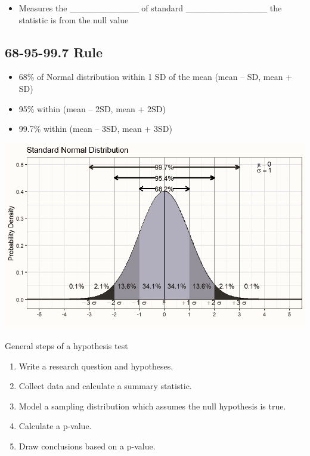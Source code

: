 \documentclass[
]{report}
\providecommand{\tightlist}{%
  \setlength{\itemsep}{0pt}\setlength{\parskip}{0pt}}
\begin{document}
\vspace{0.5in}

\begin{itemize}
\tightlist
\item
  Measures the \_\_\_\_\_\_\_\_\_\_\_ of standard \_\_\_\_\_\_\_\_\_\_\_\_\_ the statistic is from the null value
\end{itemize}

\hypertarget{rule}{%
\subsection*{68-95-99.7 Rule}\label{rule}}

\begin{itemize}
\item
  68\% of Normal distribution within 1 SD of the mean (mean -- SD, mean + SD)
\item
  95\% within (mean -- 2SD, mean + 2SD)
\item
  99.7\% within (mean -- 3SD, mean + 3SD)
\end{itemize}

\begin{center}\includegraphics[width=0.65\linewidth]{images/Empirical_Rule_Mark_bw} \end{center}

General steps of a hypothesis test

\begin{enumerate}
\def\labelenumi{\arabic{enumi}.}
\item
  Write a research question and hypotheses.
\item
  Collect data and calculate a summary statistic.
\item
  Model a sampling distribution which assumes the null hypothesis is true.
\item
  Calculate a p-value.
\item
  Draw conclusions based on a p-value.
\end{enumerate}
\end{document}
